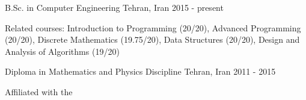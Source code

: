 

\begin{cventries}

  \cventry
    {B.Sc. in Computer Engineering} %
    {} %
    {Tehran, Iran} %
    {2015 - present} %
    {
      \begin{cvitems} %
        \item {Related courses: Introduction to Programming (20/20), Advanced Programming (20/20), Discrete Mathematics (19.75/20), Data Structures (20/20), Design and Analysis of Algorithms (19/20)}
      \end{cvitems}
    }

  \cventry
    {Diploma in Mathematics and Physics Discipline} %
    {} %
    {Tehran, Iran} %
    {2011 - 2015} %
    {
      \begin{cvitems} %
        \item {Affiliated with the }
      \end{cvitems}
    }

\end{cventries}
